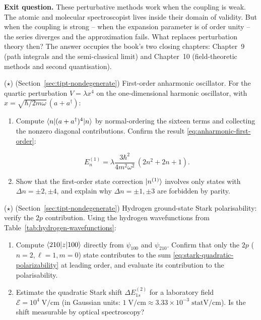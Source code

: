 \medskip\noindent\textbf{Exit question.}
These perturbative methods work when the coupling is weak. The atomic and molecular spectroscopist lives inside their domain of validity. But when the coupling is strong -- when the expansion parameter is of order unity -- the series diverges and the approximation fails. What replaces perturbation theory then? The answer occupies the book's two closing chapters: Chapter~9 (path integrals and the semi-classical limit) and Chapter~10 (field-theoretic methods and second quantisation).

\begin{problemset}

\item ($\star$) (Section~\ref{sec:tipt-nondegenerate}) First-order anharmonic oscillator. For the quartic perturbation $V = \lambda x^{4}$ on the one-dimensional harmonic oscillator, with $x = \sqrt{\hbar/2m\omega}\,(a+a^{\dagger})$:
\begin{enumerate}
\item[(a)] Compute $\braket{n|(a+a^{\dagger})^{4}|n}$ by normal-ordering the sixteen terms and collecting the nonzero diagonal contributions. Confirm the result \eqref{eq:anharmonic-first-order}:
\begin{linenomath}
\begin{equation*}
E_{n}^{(1)} = \lambda\frac{3\hbar^{2}}{4m^{2}\omega^{2}}\,(2n^{2}+2n+1).
\end{equation*}
\end{linenomath}
\item[(b)] Show that the first-order state correction $\ket{n^{(1)}}$ involves only states with $\Delta n = \pm 2, \pm 4$, and explain why $\Delta n = \pm 1, \pm 3$ are forbidden by parity.
\end{enumerate}

\item ($\star$) (Section~\ref{sec:tipt-nondegenerate}) Hydrogen ground-state Stark polarisability: verify the $2p$ contribution. Using the hydrogen wavefunctions from Table~\ref{tab:hydrogen-wavefunctions}:
\begin{enumerate}
\item[(a)] Compute $\braket{210|z|100}$ directly from $\psi_{100}$ and $\psi_{210}$. Confirm that only the $2p$ ($n=2,\ell=1,m=0$) state contributes to the sum \eqref{eq:stark-quadratic-polarizability} at leading order, and evaluate its contribution to the polarisability.
\item[(b)] Estimate the quadratic Stark shift $\Delta E_{1s}^{(2)}$ for a laboratory field $\mathcal{E} = 10^{4}\;\text{V/cm}$ (in Gaussian units: $1\;\text{V/cm} \approx 3.33 \times 10^{-3}\;\text{statV/cm}$). Is the shift measurable by optical spectroscopy?
\end{enumerate}


\end{problemset}
